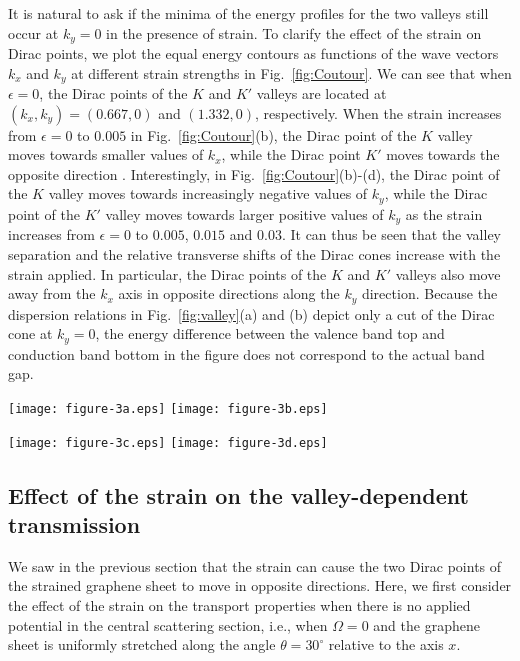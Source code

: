 \documentclass[reprint,amsmath,amssymb,aps,superscriptaddress]{revtex4-2}
\begin{document}
It is natural to ask if the minima of the energy profiles for the two valleys still occur at $k_y=0$ in the presence of strain. To clarify the effect of the strain on Dirac points, we plot the equal energy contours as functions of the wave vectors $k_x$ and $k_y$ at different strain strengths in Fig.~\ref{fig:Coutour}. We can see that when $\epsilon=0$, the Dirac points of the $K$ and $K'$ valleys are located at $(k_x,k_y)=(0.667,0)$ and $(1.332,0)$, respectively. When the strain increases from $\epsilon=0$ to $0.005$ in Fig.~\ref{fig:Coutour}(b), the Dirac point of the $K$ valley moves towards smaller values of $k_x$, while the Dirac point $K'$ moves towards the opposite direction . Interestingly, in Fig.~\ref{fig:Coutour}(b)-(d), the Dirac point of the $K$ valley moves towards increasingly negative values of $k_y$, while the Dirac point of the $K'$ valley moves towards larger positive values of $k_y$ as the strain increases from $\epsilon=0$ to $0.005$, $0.015$ and $0.03$. It can thus be seen that the valley separation and the relative transverse shifts of the Dirac cones increase with the strain applied. In particular, the Dirac points of the $K$ and $K'$ valleys also move away from the $k_x$ axis in opposite directions along the $k_y$ direction. Because the dispersion relations in Fig.~\ref{fig:valley}(a) and (b) depict only a cut of the Dirac cone at $k_y=0$, the energy difference between the valence band top and conduction band bottom in the figure does not correspond to the actual band gap.
\begin{figure*}[t]
	\centering
	\texttt{[image: figure-3a.eps]}%
	\texttt{[image: figure-3b.eps]}%
	
	\texttt{[image: figure-3c.eps]}%
	\texttt{[image: figure-3d.eps]}%
	\caption{\label{fig:Coutour} Contour plot of the energies as a function of the wave vectors $k_x$
		and $k_y$ for different strain strengths: (a) $\epsilon=0$, (b) $\epsilon=0.005$, (c) $\epsilon=0.015$, and (d) $\epsilon=0.03$.
		The solid lines are equal energy contour lines corresponding to the energy values of $1.2\ \mathrm{eV}$, $2.2\ \mathrm{eV}$, $3\ \mathrm{eV}$,
		and $4\ \mathrm{eV}$.
		The other parameters are $\Omega=0$, $\nu=0.165$, and $\theta=45^\circ$.
		The black squares denote the $(k_x, k_y, E)$ positions of the Dirac points of the $K$ and $K'$ valleys}
\end{figure*}

\subsection{Effect of the strain on the valley-dependent transmission}
We saw in the previous section that the strain can cause the two Dirac points of the strained graphene sheet to move in opposite directions. Here, we first consider the effect of the strain on the transport properties when there is no applied potential in the central scattering section, i.e., when $\Omega=0$ and the graphene sheet is uniformly stretched along the angle $\theta=30^\circ$ relative to the axis $x$.
\end{document}
